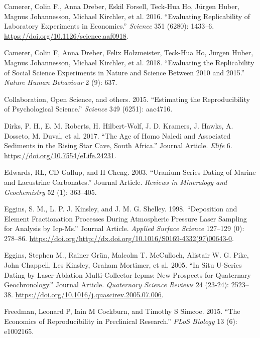 \documentclass[]{elsarticle} %
\newlength{\cslhangindent}
\newenvironment{cslreferences}%
  {\setlength{\parindent}{0pt}%
  \everypar{\setlength{\hangindent}{\cslhangindent}}\ignorespaces}%
  {\par}
\begin{document}
\hypertarget{refs}{}
\begin{cslreferences}
\leavevmode\hypertarget{ref-Camerer1433}{}%
Camerer, Colin F., Anna Dreber, Eskil Forsell, Teck-Hua Ho, Jürgen Huber, Magnus Johannesson, Michael Kirchler, et al. 2016. ``Evaluating Replicability of Laboratory Experiments in Economics.'' \emph{Science} 351 (6280): 1433--6. \url{https://doi.org/10.1126/science.aaf0918}.

\leavevmode\hypertarget{ref-camerer2018evaluating}{}%
Camerer, Colin F, Anna Dreber, Felix Holzmeister, Teck-Hua Ho, Jürgen Huber, Magnus Johannesson, Michael Kirchler, et al. 2018. ``Evaluating the Replicability of Social Science Experiments in Nature and Science Between 2010 and 2015.'' \emph{Nature Human Behaviour} 2 (9): 637.

\leavevmode\hypertarget{ref-open2015estimating}{}%
Collaboration, Open Science, and others. 2015. ``Estimating the Reproducibility of Psychological Science.'' \emph{Science} 349 (6251): aac4716.

\leavevmode\hypertarget{ref-Dirks2017}{}%
Dirks, P. H., E. M. Roberts, H. Hilbert-Wolf, J. D. Kramers, J. Hawks, A. Dosseto, M. Duval, et al. 2017. ``The Age of Homo Naledi and Associated Sediments in the Rising Star Cave, South Africa.'' Journal Article. \emph{Elife} 6. \url{https://doi.org/10.7554/eLife.24231}.

\leavevmode\hypertarget{ref-RN4495}{}%
Edwards, RL, CD Gallup, and H Cheng. 2003. ``Uranium-Series Dating of Marine and Lacustrine Carbonates.'' Journal Article. \emph{Reviews in Mineralogy and Geochemistry} 52 (1): 363--405.

\leavevmode\hypertarget{ref-RN2257}{}%
Eggins, S. M., L. P. J. Kinsley, and J. M. G. Shelley. 1998. ``Deposition and Element Fractionation Processes During Atmospheric Pressure Laser Sampling for Analysis by Icp-Ms.'' Journal Article. \emph{Applied Surface Science} 127--129 (0): 278--86. \url{https://doi.org/http://dx.doi.org/10.1016/S0169-4332(97)00643-0}.

\leavevmode\hypertarget{ref-Eggins2005}{}%
Eggins, Stephen M., Rainer Grün, Malcolm T. McCulloch, Alistair W. G. Pike, John Chappell, Les Kinsley, Graham Mortimer, et al. 2005. ``In Situ U-Series Dating by Laser-Ablation Multi-Collector Icpms: New Prospects for Quaternary Geochronology.'' Journal Article. \emph{Quaternary Science Reviews} 24 (23-24): 2523--38. \url{https://doi.org/10.1016/j.quascirev.2005.07.006}.

\leavevmode\hypertarget{ref-freedman2015economics}{}%
Freedman, Leonard P, Iain M Cockburn, and Timothy S Simcoe. 2015. ``The Economics of Reproducibility in Preclinical Research.'' \emph{PLoS Biology} 13 (6): e1002165.


\end{cslreferences}
\end{document}
